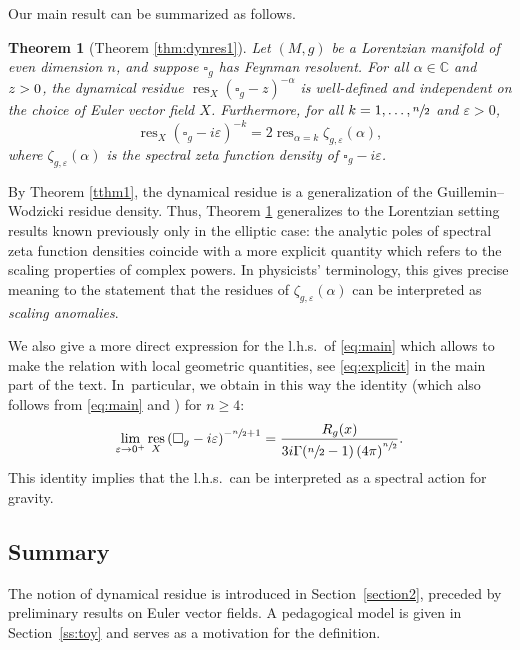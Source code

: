 \documentclass[10pt]{amsart}
\newtheorem{theorem}{Theorem}[section]
\theoremstyle{definition}
\newcommand\cc{{\mathbb C}}
\let\cv\alpha
\let\euler X
\let\Im\relax
\DeclareMathOperator{\Im}{Im}
\DeclareMathOperator{\resnorm}{res}
\DeclareMathOperator*{\res}{res}
\newcommand{\resdyn}{{\resnorm_\euler}}
\renewcommand{\sec}[1]{Section~\ref{#1}}
\begin{document}
Our main result can be summarized as follows.


\begin{theorem}[{\cf Theorem \ref{thm:dynres1}}]\label{thm:dynres} Let $(M,g)$ be a Lorentzian manifold of even dimension $n$, and suppose $\square_g$ has Feynman resolvent. For all $\cv\in\cc$ and $\Im z > 0$, the dynamical residue $\resdyn(\square_g-z)^{-\cv}$ is well-defined and independent on the choice of Euler vector field $\euler$. Furthermore, for all $k=1,\dots,\sfrac{n}{2}$ and $\varepsilon>0$,
\begin{equation}\label{eq:main}
\resdyn \left(\square_g-i \varepsilon \right)^{-k} = {2}\res_{\cv =k}\zeta_{g,\varepsilon}(\cv),
\end{equation}
where $\zeta_{g,\varepsilon}(\cv)$ is the spectral zeta function density of $\square_g-i \varepsilon$.
\end{theorem}


By Theorem \ref{tthm1}, the dynamical residue is a generalization of the Guillemin--Wodzicki residue density. Thus, Theorem \ref{thm:dynres} generalizes to the Lorentzian setting results known previously only in the elliptic case: the analytic poles of spectral zeta function densities coincide with a more explicit quantity which refers to the scaling properties of complex powers. In physicists' terminology, this gives precise meaning to the statement that the residues of $\zeta_{g,\varepsilon}(\cv)$ can be interpreted as \emph{scaling anomalies}.

We also give a more direct expression for the l.h.s.~of \eqref{eq:main} which allows to make the relation with local geometric quantities, see \eqref{eq:explicit} in the main part of the text. In~particular, we obtain in this way the identity (which also follows from \eqref{eq:main} and \cite[Th.\,1.1]{Dang2020}) for $n\geqslant 4$:
\begin{equation}\label{eq:main2}
\lim_{\varepsilon\to 0^+}\resdyn \left(\square_g-i \varepsilon \right)^{-\sfrac{n}{2}+1} = \frac{R_g(x)}{3i\Gamma(\sfrac{n}{2}-1)\left(4\pi\right)^{\sfrac{n}{2}}}.
\end{equation}
This identity implies that the l.h.s.~can be interpreted as a spectral action for gravity.

\subsection{Summary} The notion of dynamical residue is introduced in \sec{section2}, preceded by preliminary results on Euler vector fields. A pedagogical model is given in \sec{ss:toy} and serves as a motivation for the definition.
\end{document}
